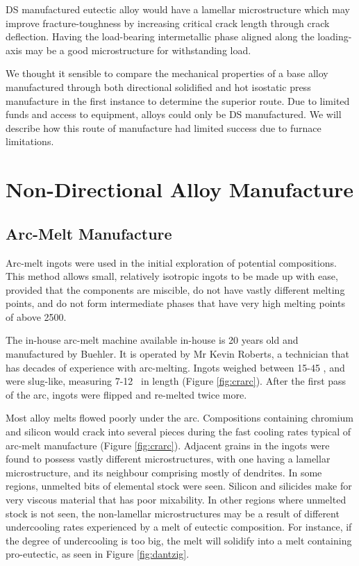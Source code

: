 DS manufactured eutectic alloy would have a lamellar microstructure which may improve fracture-toughness by increasing critical crack length through crack deflection.  Having the load-bearing intermetallic phase aligned along the loading-axis may be a good microstructure for withstanding load.

We thought it sensible to compare the mechanical properties of a base alloy manufactured through both directional solidified and hot isostatic press manufacture in the first instance to determine the superior route.  Due to limited funds and access to equipment, alloys could only be DS manufactured.  We will describe how this route of manufacture had limited success due to furnace limitations.


\section{Non-Directional Alloy Manufacture}

\subsection{Arc-Melt Manufacture} 

Arc-melt ingots were used in the initial exploration of potential compositions.  This method allows small, relatively isotropic ingots to be made up with ease, provided that the components are miscible, do not have vastly different melting points, and do not form intermediate phases that have very high melting points of above 2500\celsius.  

The in-house arc-melt machine available in-house is 20 years old and manufactured by Buehler.  It is operated by Mr Kevin Roberts, a technician that has decades of experience with arc-melting.  Ingots weighed between 15-45 \gram, and were slug-like, measuring 7-12 \centi\metre\ in length (Figure \ref{fig:crarc}).  After the first pass of the arc, ingots were flipped and re-melted twice more.

Most alloy melts flowed poorly under the arc.  Compositions containing chromium and silicon would crack into several pieces during the fast cooling rates typical of arc-melt manufacture (Figure \ref{fig:crarc}).  Adjacent grains in the ingots were found to possess vastly different microstructures, with one having a lamellar microstructure, and its neighbour comprising mostly of dendrites.  In some regions, unmelted bits of elemental stock were seen.  Silicon and silicides make for very viscous material that has poor mixability.  In other regions where unmelted stock is not seen, the non-lamellar microstructures may be a result of different undercooling rates experienced by a melt of eutectic composition.  For instance, if the degree of undercooling is too big, the melt will solidify into a melt containing pro-eutectic, as seen in Figure \ref{fig:dantzig}.

